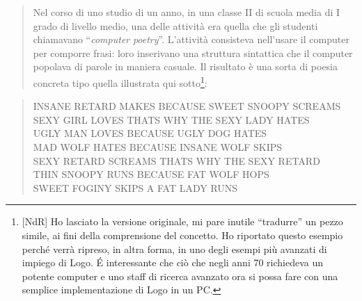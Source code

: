 \begin{quote}
Nel corso di uno studio di un anno, in una classe II di scuola  media di I grado di livello medio, una delle attività era quella che gli studenti chiamavano “\textit{computer} \textit{poetry}”. L'attività consisteva nell'usare il computer per comporre frasi: loro inserivano una struttura sintattica che il computer popolava di parole in maniera casuale. Il risultato è una sorta di poesia concreta tipo quella illustrata qui sotto\footnote{[NdR] Ho lasciato la versione originale, mi pare inutile “tradurre” un pezzo simile, ai fini della comprensione del concetto. Ho riportato questo esempio perché verrà ripreso, in altra forma, in uno degli esempi più avanzati di impiego di Logo. É interessante che ciò che negli anni 70 richiedeva un potente computer e uno staff di ricerca avanzato ora si possa fare con una semplice implementazione di Logo in un PC.}:
\end{quote}

\begin{quote}
INSANE RETARD MAKES BECAUSE SWEET SNOOPY SCREAMS\\
SEXY GIRL LOVES THATS WHY THE SEXY LADY HATES\\
UGLY MAN LOVES BECAUSE UGLY DOG HATES\\
MAD WOLF HATES BECAUSE INSANE WOLF SKIPS\\
SEXY RETARD SCREAMS THATS WHY THE SEXY RETARD\\
THIN SNOOPY RUNS BECAUSE FAT WOLF HOPS\\
SWEET FOGINY SKIPS A FAT LADY RUNS\\
\end{quote}

